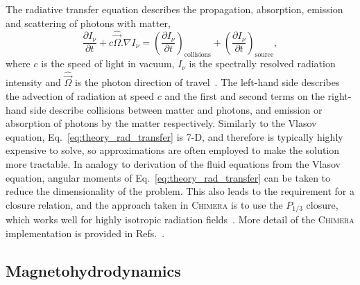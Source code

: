 The radiative transfer equation describes the propagation, absorption, emission and scattering of photons with matter,
\begin{equation}
    \label{eq:theory_rad_transfer}
    \frac{\partial I_\nu}{\partial t} + c \hat{\vec{\Omega}}.\nabla I_\nu = \left ( \frac{\partial I_\nu}{\partial t} \right )_{\text{collisions}} + \left ( \frac{\partial I_\nu}{\partial t} \right )_{\text{source}},
\end{equation}
where $c$ is the speed of light in vacuum, $I_\nu$ is the spectrally resolved radiation intensity and $\hat{\vec{\Omega}}$ is the photon direction of travel~\cite{castor_radiation_2004}.
The left-hand side describes the advection of radiation at speed $c$ and the first and second terms on the right-hand side describe collisions between matter and photons, and emission or absorption of photons by the matter respectively.
Similarly to the Vlasov equation, Eq.~\ref{eq:theory_rad_transfer} is 7-D, and therefore is typically highly expensive to solve, so approximations are often employed to make the solution more tractable.
In analogy to derivation of the fluid equations from the Vlasov equation, angular moments of Eq.~\ref{eq:theory_rad_transfer} can be taken to reduce the dimensionality of the problem.
This also leads to the requirement for a closure relation, and the approach taken in \textsc{Chimera} is to use the $P_{1/3}$ closure, which works well for highly isotropic radiation fields~\cite{morel_diffusionlimit_2000}.
More detail of the \textsc{Chimera} implementation is provided in Refs.~\cite{jennings_radiation_2005,mcglinchey_radiationhydrodynamics_2017}.

\subsection{Magnetohydrodynamics}%
\label{sec:theory_MHD}

